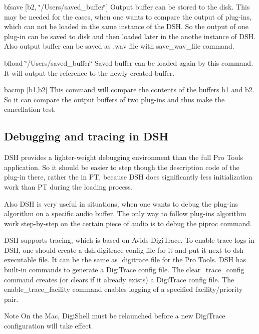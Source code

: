 \begin{DoxyEnumerate}
\item {\ttfamily bfsave \mbox{[}b2, \char`\"{}/\+Users/saved\+\_\+buffer\char`\"{}\mbox{]}} Output buffer can be stored to the disk. This may be needed for the cases, when one wants to compare the output of plug-\/ins, which can not be loaded in the same instance of the D\+SH. So the output of one plug-\/in can be saved to disk and then loaded later in the anothe instance of D\+SH. Also output buffer can be saved as .wav file with {\ttfamily save\+\_\+wav\+\_\+file} command. ~\newline
  
\item {\ttfamily bfload \char`\"{}/\+Users/saved\+\_\+buffer\char`\"{}} Saved buffer can be loaded again by this command. It will output the reference to the newly created buffer. ~\newline
  
\item {\ttfamily bacmp \mbox{[}b1,b2\mbox{]}} This command will compare the contents of the buffers b1 and b2. So it can compare the output buffers of two plug-\/ins and thus make the cancellation test. ~\newline
  
\end{DoxyEnumerate}



 \hypertarget{a00835_dsh_guide_03_debugging_and_tracing}{}\subsection{Debugging and tracing in D\+SH}\label{a00835_dsh_guide_03_debugging_and_tracing}
 D\+SH provides a lighter-\/weight debugging environment than the full Pro Tools application. So it should be easier to step though the description code of the plug-\/in there, rather the in PT, because D\+SH does significantly less initialization work than PT during the loading process.

Also D\+SH is very useful in situations, when one wants to debug the plug-\/in\textquotesingle{}s algorithm on a specific audio buffer. The only way to follow plug-\/in\textquotesingle{}s algorithm work step-\/by-\/step on the certain piece of audio is to debug the {\ttfamily piproc} command.

D\+SH supports tracing, which is based on Avid\textquotesingle{}s Digi\+Trace. To enable trace logs in D\+SH, one should create a dsh.\+digitrace config file for it and put it next to dsh executable file. It can be the same as .digitrace file for the Pro Tools. D\+SH has built-\/in commands to generate a Digi\+Trace config file. The clear\+\_\+trace\+\_\+config command creates (or clears if it already exists) a Digi\+Trace config file. The enable\+\_\+trace\+\_\+facility command enables logging of a specified facility/priority pair. \begin{DoxyNote}{Note}
On the Mac, Digi\+Shell must be relaunched before a new Digi\+Trace configuration will take effect.
\end{DoxyNote}



